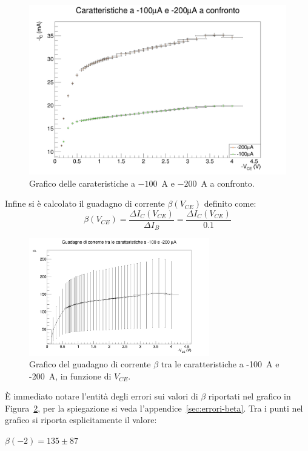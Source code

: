 \documentclass[../main.tex]{subfiles}
\begin{document}
    \begin{figure}[h!]
        \centering
        \includegraphics[width=.8\textwidth]{../../images/caratteristiche-confronto}
        \caption{Grafico delle carateristiche a $-100$~\textmu A e $-200$~\textmu A a confronto.}
        \label{fig:aggregato}
    \end{figure}

    \noindent Infine si è calcolato il guadagno di corrente $\beta(V_{CE})$ definito come:
    \begin{equation*}
        \beta(V_{CE}) = \frac{\varDelta I_C(V_{CE})}{\varDelta I_B} = \frac{\varDelta I_C(V_{CE})}{0.1}
    \end{equation*}

    \begin{figure}[h!]
        \centering
        \includegraphics[width=0.7\textwidth]{../../images/beta}
        \caption{
            Grafico del guadagno di corrente $\beta$ tra le
            caratteristiche a -100~\textmu A e -200~\textmu A, in
            funzione di $V_{CE}$.
        }
        \label{fig:beta}
    \end{figure}
    \noindent È immediato notare l'entità degli errori sui valori di $\beta$
    riportati nel grafico in Figura~\ref{fig:beta}, per la
    spiegazione si veda l'appendice~\ref{sec:errori-beta}.
    Tra i punti nel grafico si riporta esplicitamente il valore:
    \begin{center}
        $\beta(-2) = 135 \pm  87$
    \end{center}
\end{document}
